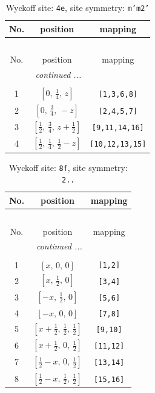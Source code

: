 \documentclass[fleqn,8pt]{jsarticle}
\begin{document}
\renewcommand{\arraystretch}{1.2}
\begin{longtable}{ccc}
\caption{Wyckoff site: {\tt 4e}, site symmetry: {\tt m'm2'}}
 \\
 \hline \hline
No. & position & mapping \\ \hline \endfirsthead

\multicolumn{2}{l}{\tablename\ \thetable{}} \\
 \hline \hline
No. & position & mapping \\ \hline \endhead

 \hline \hline
\multicolumn{2}{r}{\footnotesize\it continued ...} \\ \endfoot

 \hline \hline
\multicolumn{2}{r}{} \\ \endlastfoot

1 & $\left[ 0,\, \frac{1}{4},\, z \right]$ & {\tt [1,3,6,8]} \\ \hline
2 & $\left[ 0,\, \frac{3}{4},\, - z \right]$ & {\tt [2,4,5,7]} \\ \hline
3 & $\left[ \frac{1}{2},\, \frac{3}{4},\, z + \frac{1}{2} \right]$ & {\tt [9,11,14,16]} \\ \hline
4 & $\left[ \frac{1}{2},\, \frac{1}{4},\, \frac{1}{2} - z \right]$ & {\tt [10,12,13,15]} \\
\end{longtable}
\renewcommand{\arraystretch}{1.2}
\begin{longtable}{ccc}
\caption{Wyckoff site: {\tt 8f}, site symmetry: {\tt 2..}}
 \\
 \hline \hline
No. & position & mapping \\ \hline \endfirsthead

\multicolumn{2}{l}{\tablename\ \thetable{}} \\
 \hline \hline
No. & position & mapping \\ \hline \endhead

 \hline \hline
\multicolumn{2}{r}{\footnotesize\it continued ...} \\ \endfoot

 \hline \hline
\multicolumn{2}{r}{} \\ \endlastfoot

1 & $\left[ x,\, 0,\, 0 \right]$ & {\tt [1,2]} \\ \hline
2 & $\left[ x,\, \frac{1}{2},\, 0 \right]$ & {\tt [3,4]} \\ \hline
3 & $\left[ - x,\, \frac{1}{2},\, 0 \right]$ & {\tt [5,6]} \\ \hline
4 & $\left[ - x,\, 0,\, 0 \right]$ & {\tt [7,8]} \\ \hline
5 & $\left[ x + \frac{1}{2},\, \frac{1}{2},\, \frac{1}{2} \right]$ & {\tt [9,10]} \\ \hline
6 & $\left[ x + \frac{1}{2},\, 0,\, \frac{1}{2} \right]$ & {\tt [11,12]} \\ \hline
7 & $\left[ \frac{1}{2} - x,\, 0,\, \frac{1}{2} \right]$ & {\tt [13,14]} \\ \hline
8 & $\left[ \frac{1}{2} - x,\, \frac{1}{2},\, \frac{1}{2} \right]$ & {\tt [15,16]} \\
\end{longtable}
\end{document}
